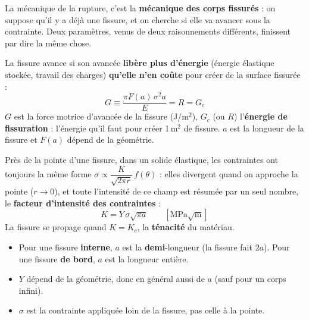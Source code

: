 La mécanique de la rupture, c'est la \textbf{mécanique des corps fissurés} : on suppose qu'il y a
déjà une fissure, et on cherche si elle va avancer sous la contrainte. Deux paramètres,
venus de deux raisonnements différents, finissent par dire la même chose.

\begin{defnbox}[title={Premier point de vue : l'énergie ($G$, $G_c$)}]
La fissure avance si son avancée \textbf{libère plus d'énergie} (énergie élastique stockée,
travail des charges) \textbf{qu'elle n'en coûte} pour créer de la surface fissurée :
\[ G \equiv \frac{\pi F(a)\,\sigma^2 a}{E} = R = G_c \]
$G$ est la force motrice d'avancée de la fissure (J/m$^2$), $G_c$ (ou $R$) l'\textbf{énergie de
fissuration} : l'énergie qu'il faut pour créer 1\,m$^2$ de fissure. $a$ est la longueur de la
fissure et $F(a)$ dépend de la géométrie.
\end{defnbox}

\begin{defnbox}[title={Second point de vue : les contraintes ($K$, $K_c$)}]
Près de la pointe d'une fissure, dans un solide élastique, les contraintes ont toujours la même
forme $\sigma \propto \dfrac{K}{\sqrt{2\pi r}}\,f(\theta)$ : elles divergent quand on approche
la pointe ($r \to 0$), et toute l'intensité de ce champ est résumée par un seul nombre, le
\textbf{facteur d'intensité des contraintes} :
\[ K = Y\,\sigma\sqrt{\pi a} \qquad [\text{MPa}\sqrt{\text{m}}] \]
La fissure se propage quand $K = K_c$, la \textbf{ténacité} du matériau.
\end{defnbox}


\begin{warnbox}[title={Les pièges de $K = Y\sigma\sqrt{\pi a}$}]
\begin{itemize}
  \item Pour une fissure \textbf{interne}, $a$ est la \textbf{demi}-longueur (la fissure fait
        $2a$). Pour une fissure \textbf{de bord}, $a$ est la longueur entière.
  \item $Y$ dépend de la géométrie, donc en général aussi de $a$ (sauf pour un corps infini).
  \item $\sigma$ est la contrainte appliquée loin de la fissure, pas celle à la pointe.
\end{itemize}
\end{warnbox}

